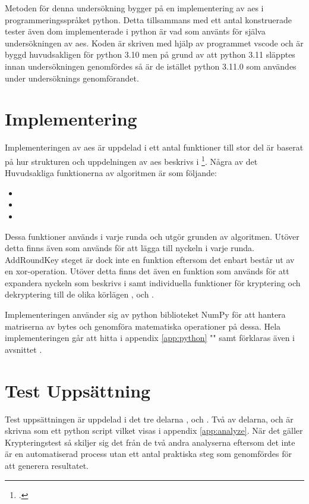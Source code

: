 Metoden för denna undersökning bygger på en implementering av \acrshort{aes} i programmeringsspråket
\gls{python}. Detta tillsammans med ett antal konstruerade tester även dom implementerade i
\gls{python} är vad som använts för själva undersökningen av \acrshort{aes}. Koden
är skriven med hjälp av programmet \gls{vscode} och är byggd huvudsakligen för \gls{python} 3.10 men
på grund av att \gls{python} 3.11 släpptes innan undersökningen genomfördes så är de istället \gls{python} 3.11.0
som användes under undersöknings genomförandet.

\section{Implementering} %
Implementeringen av \acrshort{aes} är uppdelad i ett antal funktioner till stor del är baserat på
hur strukturen och uppdelningen av \acrshort{aes} beskrivs i \footcite{daemen1999aes}.
Några av det Huvudsakliga funktionerna av algoritmen är som följande:
\begin{itemize}
    \item \texttt{}
    \item \texttt{}
    \item \texttt{}
\end{itemize}

Dessa funktioner används i varje runda och utgör grunden av algoritmen. Utöver detta finns
även  som används för att lägga till nyckeln i varje runda. AddRoundKey steget är dock inte
en funktion eftersom det enbart består ut av en \gls{xor}-operation. Utöver detta finns det även
en funktion som används för att expandera nyckeln som beskrivs i  samt
individuella funktioner för kryptering och dekryptering till de olika körlägen ,  och
.

Implementeringen använder sig av \gls{python} biblioteket NumPy för att hantera matriserna av \gls{byte}s och genomföra
matematiska operationer på dessa. Hela implementeringen går att hitta i appendix \ref{app:python} "" samt
förklaras även i avsnittet .

\section{Test Uppsättning} %
Test uppsättningen är uppdelad i det tre delarna ,  och . Två av delarna,  och
 är skrivna som ett \gls{python} script vilket visas i appendix \ref{app:analyze}. När det gäller Krypteringstest så skiljer sig det från de två andra analyserna eftersom det
inte är en automatiserad process utan ett antal praktiska steg som genomfördes för att generera resultatet.

